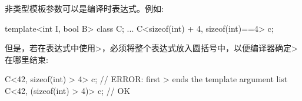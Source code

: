 非类型模板参数可以是编译时表达式。例如:

\begin{cpp}
template<int I, bool B>
class C;
...
C<sizeof(int) + 4, sizeof(int)==4> c;
\end{cpp}

但是，若在表达式中使用>，必须将整个表达式放入圆括号中，以便编译器确定>在哪里结束:

\begin{cpp}
C<42, sizeof(int) > 4> c; // ERROR: first > ends the template argument list
C<42, (sizeof(int) > 4)> c; // OK
\end{cpp}











